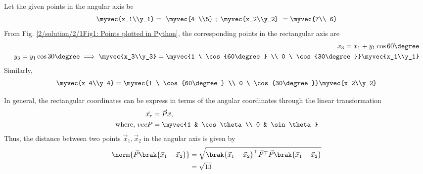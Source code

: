 
Let the given points in the angular axis be
\begin{equation}
\myvec{x_1\\y_1} = \ \myvec{4 \\5} \ ; \ \myvec{x_2\\y_2} \ = \myvec{7\\ 6}\label{2/solution/2/11.0.1}
\end{equation}
From    Fig. \ref{2/solution/2/1Fig1: Points plotted in Python},
the corresponding points in the rectangular axis are
\begin{align}
x_3 = x_1+y_1\cos 60\degree\\
y_3 = y_1\cos 30\degree
\implies \myvec{x_3\\y_3} = \myvec{1 \ \cos{60\degree} \\ 0 \  \cos{30\degree}} \myvec{x_1\\y_1}\label{2/solution/2/1eq:1.0.2}   
\end{align}
Similarly,\\
\begin{align}
    \myvec{x_4\\y_4} = \myvec{1 \ \cos{60\degree} \\ 0 \  \cos{30\degree}} \myvec{x_2\\y_2}\label{2/solution/2/1eq:1.0.3}
\end{align}
    
In general, the rectangular coordinates can be express in terms of the angular coordinates through the 
linear transformation
\begin{align}
    \vec{x}_r &= \vec{P}\vec{x}, \\
    \text{where, }
vec{P}&= \myvec{1   &  \cos \theta \\ 0 & \sin \theta} 
\end{align}
Thus, the distance between two points $\vec{x}_1, \vec{x}_2$ in the angular axis  is given by
\begin{align}
    \norm{\vec{P}\brak{\vec{x}_1-\vec{x}_2}} &= \sqrt{\brak{\vec{x}_1-\vec{x}_2}^\top\vec{P}^\top \vec{P}\brak{\vec{x}_1-\vec{x}_2}} \\
    &= \sqrt{13}
\end{align}


